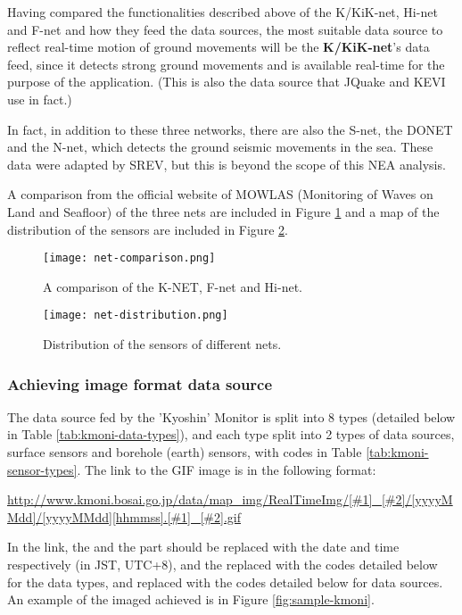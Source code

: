 Having compared the functionalities described above of the K/KiK-net, Hi-net and F-net and how they feed the data sources, the most suitable data source to reflect real-time motion of ground movements will be the \textbf{K/KiK-net}'s data feed, since it detects strong ground movements and is available real-time for the purpose of the application. (This is also the data source that JQuake and KEVI use in fact.)

In fact, in addition to these three networks, there are also the S-net, the DONET and the N-net, which detects the ground seismic movements in the sea. These data were adapted by SREV, but this is beyond the scope of this NEA analysis.

A comparison from the official website of MOWLAS (Monitoring of Waves on Land and Seafloor) \autocite{nied-mowlas} of the three nets are included in Figure \ref{fig:net-comparison} and a map of the distribution of the sensors are included in Figure \ref{fig:net-distribution}.

\begin{figure}[htp]
    \centering
    \texttt{[image: net-comparison.png]}
    \caption{A comparison of the K-NET, F-net and Hi-net.}
    \label{fig:net-comparison}
\end{figure}

\begin{figure}[htp]
    \centering
    \texttt{[image: net-distribution.png]}
    \caption{Distribution of the sensors of different nets.}
    \label{fig:net-distribution}
\end{figure}

\subsubsection{Achieving image format data source}

The data source fed by the 'Kyoshin' Monitor is split into 8 types (detailed below in Table \ref{tab:kmoni-data-types}), and each type split into 2 types of data sources, surface sensors and borehole (earth) sensors, with codes in Table \ref{tab:kmoni-sensor-types}. The link to the GIF image is in the following format:

\begin{center}
    \url{http://www.kmoni.bosai.go.jp/data/map_img/RealTimeImg/[#1]_[#2]/[yyyyMMdd]/[yyyyMMdd][hhmmss].[#1]_[#2].gif}
\end{center}

In the link, the \Code{[yyyyMMdd]} and the \Code{[hhmmss]} part should be replaced with the date and time respectively (in JST, UTC+8), and the  replaced with the codes detailed below for the data types, and  replaced with the codes detailed below for data sources. An example of the imaged achieved is in Figure \ref{fig:sample-kmoni}.

